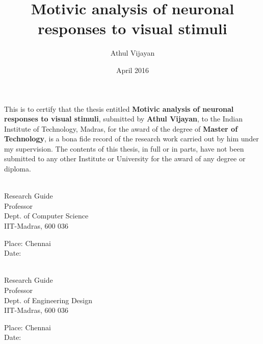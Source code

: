 \documentclass[MTech]{iitmdiss}
\def\thesistitle{Motivic analysis of neuronal responses to visual stimuli}
\def\thesisauthor{Athul Vijayan}
\begin{document}


\title{\thesistitle}

\author{\thesisauthor}

\date{April 2016}

\begin{singlespace}
\maketitle 
\end{singlespace} 



\certificate

\vspace*{0.5in}

\noindent This is to certify that the thesis entitled {\bf {\thesistitle}}, 
submitted by {\bf {\thesisauthor}}, to the Indian Institute of Technology, 
Madras, for the award of the degree of {\bf Master of Technology}, 
is a bona fide record of the research work carried out by him under my
supervision. The contents of this thesis, in full or in parts, have not been
submitted to any other Institute or University for the award of any degree or
diploma.

\vspace*{1.4in}
\hspace*{-0.25in}
\begin{minipage}{.5\textwidth}
\begin{singlespace}
 \\
\noindent Research Guide \\ 
\noindent Professor \\
\noindent Dept. of Computer Science\\
\noindent IIT-Madras, 600 036 \\
\end{singlespace}
\vspace*{0.20in}
\noindent Place: Chennai\\ 
Date:
\end{minipage}%
\begin{minipage}{.5\textwidth}
\begin{singlespace}
 \\
\noindent Research Guide \\ 
\noindent Professor \\
\noindent Dept. of Engineering Design \\
\noindent IIT-Madras, 600 036 \\
\end{singlespace}
\vspace*{0.20in}
\noindent Place: Chennai\\ 
Date:
\end{minipage}%
\acknowledgements
\end{document}
